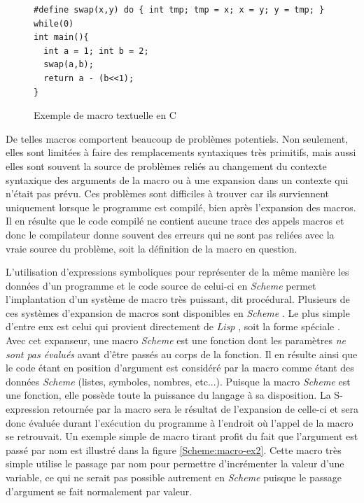 \documentclass[12pt,twoside,letterpaper,francais]{book}
\newcommand{\lisp}{{\textit{Lisp }}}
\newcommand{\Schemelang}{{\textit{Scheme }}}
\newcommand{\scheme}[1]{\selectlanguage{english}{\tt #1}\selectlanguage{french}}
\begin{document}
\begin{figure}[htb!]
  \begin{verbatim}
#define swap(x,y) do { int tmp; tmp = x; x = y; y = tmp; } while(0)
int main(){
  int a = 1; int b = 2;
  swap(a,b);
  return a - (b<<1);
}
  \end{verbatim}
  \caption{Exemple de macro textuelle en C}
  \label{Scheme:c-macros}
\end{figure}

De telles macros comportent beaucoup de problèmes potentiels. Non
seulement, elles sont limitées à faire des remplacements syntaxiques
très primitifs, mais aussi elles sont souvent la source de problèmes
reliés au changement du contexte syntaxique des arguments de la macro
ou à une expansion dans un contexte qui n'était pas prévu. Ces
problèmes sont difficiles à trouver car ils surviennent uniquement
lorsque le programme est compilé, bien après l'expansion des
macros. Il en résulte que le code compilé ne contient aucune trace des
appels macros et donc le compilateur donne souvent des erreurs qui ne
sont pas reliées avec la vraie source du problème, soit la définition
de la macro en question.

L'utilisation d'expressions symboliques pour représenter de la même
manière les données d'un programme et le code source de celui-ci en
\Schemelang permet l'implantation d'un système de macro très puissant,
dit procédural. Plusieurs de ces systèmes d'expansion de macros sont
disponibles en \Schemelang. Le plus simple d'entre eux est celui qui
provient directement de \lisp, soit la forme spéciale
\scheme{define-macro}. Avec cet expanseur, une macro \Schemelang est
une fonction dont les paramètres \emph{ne sont pas évalués} avant
d'être passés au corps de la fonction. Il en résulte ainsi que le code
étant en position d'argument est considéré par la macro comme étant
des données \Schemelang (listes, symboles, nombres, etc...). Puisque
la macro \Schemelang est une fonction, elle possède toute la puissance
du langage à sa disposition. La S-expression retournée par la macro
sera le résultat de l'expansion de celle-ci et sera donc évaluée
durant l'exécution du programme à l'endroit où l'appel de la macro se
retrouvait. Un exemple simple de macro tirant profit du fait que
l'argument est passé par nom est illustré dans la figure
\ref{Scheme:macro-ex2}. Cette macro très simple utilise le passage par
nom pour permettre d'incrémenter la valeur d'une variable, ce qui ne
serait pas possible autrement en \Schemelang puisque le passage
d'argument se fait normalement par valeur.\\
\end{document}
